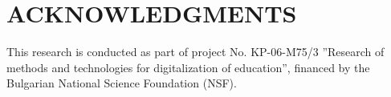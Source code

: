 \documentclass[a4paper,twocolumn,10pt]{article}
\begin{document}
\section{ACKNOWLEDGMENTS}

This research is conducted as part of project No. KP-06-M75/3 ''Research of methods and technologies for digitalization of education'', financed by the Bulgarian National Science Foundation (NSF).



\end{document}
